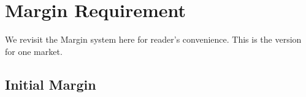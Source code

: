 \documentclass[notitlepage,reqno,11pt]{amsart}
\numberwithin{equation}{section}
\newcommand{\dt}{\delta}
\begin{document}
    


\section{Margin Requirement}

We revisit the Margin system here for reader's convenience. This is the version for one market.

\subsection{Initial Margin}
\end{document}
